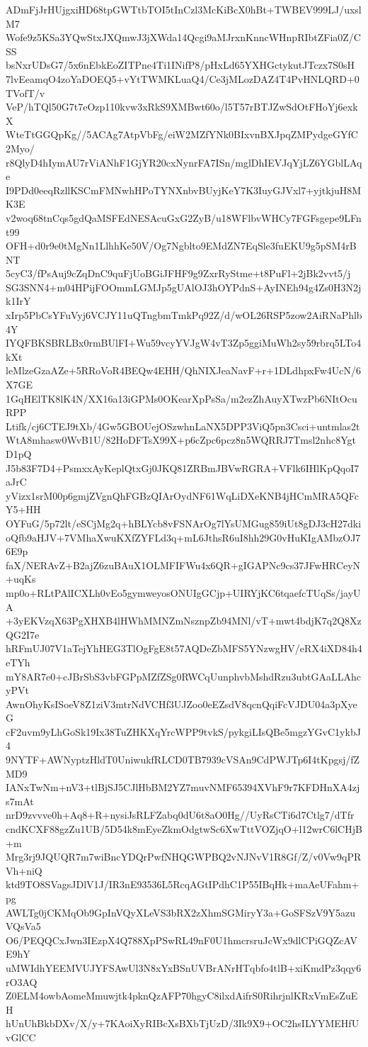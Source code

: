 ADmFjJrHUjgxiHD68tpGWTtbTOI5tInCzl3McKiBcX0hBt+TWBEV999LJ/uxslM7
Wofe9z5KSa3YQwStxJXQmwJ3jXWda14Qcgi9aMJrxnKnncWHnpRIbtZFia0Z/CSS
bsNxrUDsG7/5x6nEbkEoZITPne4Ti1INifP8/pHxLd65YXHGctykutJTczx7S0sH
7lvEeamqO4zoYaDOEQ5+vYtTWMKLuaQ4/Ce3jMLozDAZ4T4PvHNLQRD+0TVofT/v
VeP/hTQl50G7t7eOzp110kvw3xRkS9XMBwt60o/l5T57rBTJZwSdOtFHoYj6exkX
WteTtGGQpKg//5ACAg7AtpVbFg/eiW2MZfYNk0BIxvnBXJpqZMPydgeGYfC2Myo/
r8QlyD4hIymAU7rViANhF1GjYR20cxNynrFA7ISn/mglDhIEVJqYjLZ6YGblLAqe
I9PDd0eeqRzllKSCmFMNwhHPoTYNXnbvBUyjKeY7K3IuyGJVxl7+yjtkjuH8MK3E
v2woq68tnCqs5gdQaMSFEdNESAcuGxG2ZyB/u18WFlbvWHCy7FGFsgepe9LFnt99
OFH+d0r9e0tMgNn1LlhhKe50V/Og7Ngblto9EMdZN7EqSle3fuEKU9g5pSM4rBNT
5cyC3/fPsAuj9cZqDnC9quFjUoBGiJFHF9g9ZxrRyStme+t8PuFl+2jBk2vvt5/j
SG3SNN4+m04HPijFOOmmLGMJp5gUAlOJ3hOYPdnS+AyINEh94g4Zs0H3N2jk1IrY
xIrp5PbCsYFuVyj6VCJY11uQTngbmTmkPq92Z/d/wOL26RSP5zow2AiRNaPhlb4Y
IYQFBKSBRLBx0rmBUlFI+Wu59vcyYVJgW4vT3Zp5ggiMuWh2sy59rbrq5LTo4kXt
leMlzeGzaAZe+5RRoVoR4BEQw4EHH/QhNIXJeaNavF+r+1DLdhpxFw4UcN/6X7GE
1GqHElTK8lK4N/XX16a13iGPMs0OKearXpPsSa/m2ezZhAuyXTwzPb6NItOcuRPP
Ltifk/cj6CTEJ9tXb/4Gw5GBOUejOSzwhnLaNX5DPP3ViQ5pn3Csci+untmlas2t
WtA8mhasw0WvB1U/82HoDFTsX99X+p6cZpc6pcz8n5WQRRJ7Tmsl2nhc8YgtD1pQ
J5b83F7D4+PsmxxAyKeplQtxGj0JKQ81ZRBmJBVwRGRA+VFlk6IHlKpQqoI7aJrC
yVizx1srM00p6gmjZVgnQhFGBzQIArOydNF61WqLiDXeKNB4jHCmMRA5QFcY5+HH
OYFuG/5p72lt/eSCjMg2q+hBLYcb8vFSNArOg7lYsUMGug859iUt8gDJ3cH27dki
oQfb9aHJV+7VMhaXwuKXfZYFLd3q+mL6JthsR6uI8hh29G0vHuKIgAMbzOJ76E9p
faX/NERAvZ+B2ajZ6zuBAuX1OLMFIFWu4x6QR+gIGAPNc9cs37JFwHRCeyN+uqKs
mp0o+RLtPAlICXLh0vEo5gymweyosONUIgGCjp+UIRYjKC6tqaefcTUqSs/jayUA
+3yEKVzqX63PgXHXB4lHWhMMNZmNsznpZb94MNl/vT+mwt4bdjK7q2Q8XzQG2I7e
hRFmUJ07V1aTejYhHEG3TlOgFgE8t57AQDeZbMFS5YNzwgHV/eRX4iXD84h4eTYh
mY8AR7e0+cJBrSbS3vbFGPpMZfZSg0RWCqUunphvbMshdRzu3ubtGAaLLAhcyPVt
AwnOhyKsISoeV8Z1ziV3mtrNdVCHf3UJZoo0eEZsdV8qcnQqiFcVJDU04a3pXyeG
cF2uvm9yLhGoSk19Ix38TuZHKXqYrcWPP9tvkS/pykgiLIsQBe5mgzYGvC1ykbJ4
9NYTF+AWNyptzHldT0UniwukfRLCD0TB7939cVSAn9CdPWJTp6I4tKpgsj/fZMD9
IANxTwNm+nV3+tlBjSJ5CJlHbBM2YZ7muvNMF65394XVhF9r7KFDHnXA4zjs7mAt
nrD9zvvve0h+Aq8+R+nysiJsRLFZabq0dU6t8aO0Hg//UyRsCTi6d7Ctlg7/dTfr
cndKCXF88gzZu1UB/5D54k8mEyeZkmOdgtwSc6XwTttVOZjqO+l12wrC6lCHjB+m
Mrg3rj9JQUQR7m7wiBncYDQrPwfNHQGWPBQ2vNJNvV1R8Gf/Z/v0Vw9qPRVh+niQ
ktd9TO8SVagsJDlV1J/IR3nE93536L5RcqAGtIPdhC1P55IBqHk+maAeUFahm+pg
AWLTg0jCKMqOb9GpInVQyXLeVS3bRX2zXhmSGMiryY3a+GoSFSzV9Y5azuVQsVa5
O6/PEQQCxJwn3IEzpX4Q788XpPSwRL49nF0U1hmcrsruJcWx9dlCPiGQZcAVE9hY
uMWIdhYEEMVUJYFSAwUl3N8xYxBSnUVBrANrHTqbfo4tlB+xiKmdPz3qqy6rO3AQ
Z0ELM4owbAomeMmuwjtk4pknQzAFP70hgyC8ilxdAifrS0RihrjnlKRxVmEsZuEH
hUnUhBkbDXv/X/y+7KAoiXyRIBcXsBXbTjUzD/3Ik9X9+OC2hsILYYMEHfUvGlCC
